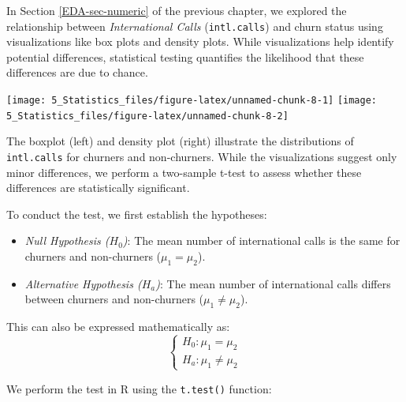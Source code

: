 \documentclass[
  11pt,
]{book}
\providecommand{\tightlist}{%
  \setlength{\itemsep}{0pt}\setlength{\parskip}{0pt}}
\theoremstyle{definition}
\theoremstyle{definition}
\theoremstyle{definition}
\theoremstyle{definition}
\theoremstyle{remark}
\begin{document}
In Section \ref{EDA-sec-numeric} of the previous chapter, we explored the relationship between \emph{International Calls} (\texttt{intl.calls}) and churn status using visualizations like box plots and density plots. While visualizations help identify potential differences, statistical testing quantifies the likelihood that these differences are due to chance.

\texttt{[image: 5\_Statistics\_files/figure-latex/unnamed-chunk-8-1]} \texttt{[image: 5\_Statistics\_files/figure-latex/unnamed-chunk-8-2]}

The boxplot (left) and density plot (right) illustrate the distributions of \texttt{intl.calls} for churners and non-churners. While the visualizations suggest only minor differences, we perform a two-sample t-test to assess whether these differences are statistically significant.

To conduct the test, we first establish the hypotheses:

\begin{itemize}
\tightlist
\item
  \emph{Null Hypothesis (\(H_0\))}: The mean number of international calls is the same for churners and non-churners (\(\mu_1 = \mu_2\)).
\item
  \emph{Alternative Hypothesis (\(H_a\))}: The mean number of international calls differs between churners and non-churners (\(\mu_1 \neq \mu_2\)).
\end{itemize}

This can also be expressed mathematically as:
\[
\begin{cases}
    H_0: \mu_1 = \mu_2   \\
    H_a: \mu_1 \neq \mu_2 
\end{cases}
\]

We perform the test in R using the \texttt{t.test()} function:
\end{document}
